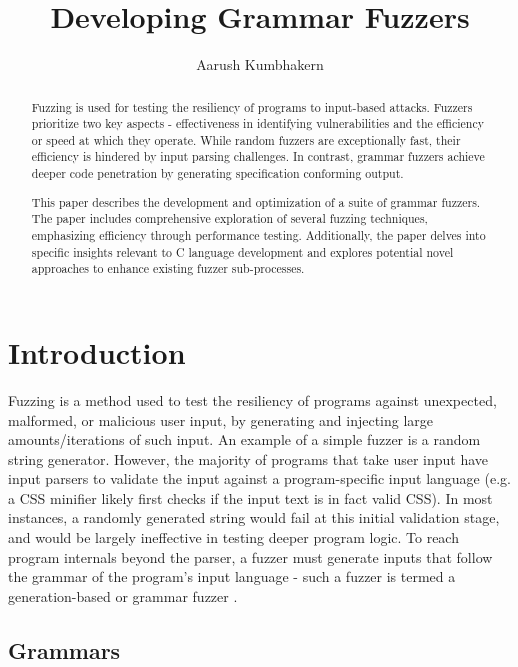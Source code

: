 \documentclass[8pt, twoside]{extarticle}
\title{Developing Grammar Fuzzers}
\author{Aarush Kumbhakern}
\begin{document}
\thispagestyle{empty}

\maketitle

\begin{abstract}
	\small

	Fuzzing is used for testing the resiliency of programs to input-based attacks. Fuzzers prioritize two key aspects - effectiveness in identifying vulnerabilities and the efficiency or speed at which they operate. While random fuzzers are exceptionally fast, their efficiency is hindered by input parsing challenges. In contrast, grammar fuzzers achieve deeper code penetration by generating specification conforming output.

    This paper describes the development and optimization of a suite of grammar fuzzers. The paper includes comprehensive exploration of several fuzzing techniques, emphasizing efficiency through performance testing. Additionally, the paper delves into specific insights relevant to C language development and explores potential novel approaches to enhance existing fuzzer sub-processes.
\end{abstract}


\section{Introduction}

Fuzzing is a method used to test the resiliency of programs against unexpected, malformed, or malicious user input, by generating and injecting large amounts/iterations of such input. An example of a simple fuzzer is a random string generator. However, the majority of programs that take user input have input parsers to validate the input against a program-specific input language (e.g. a CSS minifier likely first checks if the input text is in fact valid CSS). In most instances, a randomly generated string would fail at this initial validation stage, and would be largely ineffective in testing deeper program logic. To reach program internals beyond the parser, a fuzzer must generate inputs that follow the grammar of the program's input language - such a fuzzer is termed a generation-based or grammar fuzzer \cite{Felderer_2016}. 

\subsection{Grammars}
\end{document}
